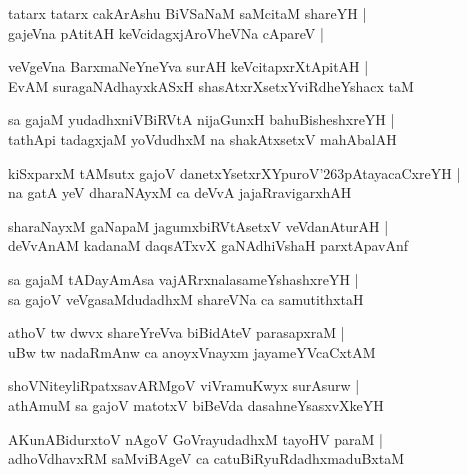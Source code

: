 \documentclass[twoside,12pt,openright]{book}
\def\S{\char'263}
\newcounter{shloka}[chapter]
\begin{document}
\begin{shloka}%
tatarx tatarx cakArAshu BiVSaNaM saMcitaM shareYH |\\
gajeVna pAtitAH keVcidagxjAroVheVNa cApareV |
\end{shloka}

\begin{shloka}%
veVgeVna BarxmaNeYneYva surAH keVcitapxrXtApitAH |\\
EvAM suragaNAdhayxkASxH shasAtxrXsetxYviRdheYshacx taM 
\end{shloka}

\begin{shloka}%
sa gajaM yudadhxniVBiRVtA nijaGunxH bahuBisheshxreYH |\\
tathApi tadagxjaM yoVdudhxM na shakAtxsetxV mahAbalAH 
\end{shloka}

\begin{shloka}%
kiSxparxM tAMsutx gajoV danetxYsetxrXYpuroV\S pAtayacaCxreYH |\\
na gatA yeV dharaNAyxM ca deVvA jajaRravigarxhAH 
\end{shloka}

\begin{shloka}%
sharaNayxM gaNapaM jagumxbiRVtAsetxV veVdanAturAH |\\
deVvAnAM kadanaM daqsATxvX gaNAdhiVshaH parxtApavAnf
\end{shloka}

\begin{shloka}%
sa gajaM tADayAmAsa vajARrxnalasameYshashxreYH |\\
sa gajoV veVgasaMdudadhxM shareVNa ca samutithxtaH 
\end{shloka}

\begin{shloka}%
athoV tw dwvx shareYreVva biBidAteV parasapxraM |\\
uBw tw nadaRmAnw ca anoyxVnayxm jayameYVcaCxtAM 
\end{shloka}

\begin{shloka}%
shoVNiteyliRpatxsavARMgoV viVramuKwyx surAsurw |\\
athAmuM sa gajoV matotxV biBeVda dasahneYsasxvXkeYH
\end{shloka}

\begin{shloka}%
AKunABidurxtoV nAgoV GoVrayudadhxM tayoHV paraM |\\
adhoVdhavxRM saMviBAgeV ca catuBiRyuRdadhxmaduBxtaM 
\end{shloka}
\end{document}
